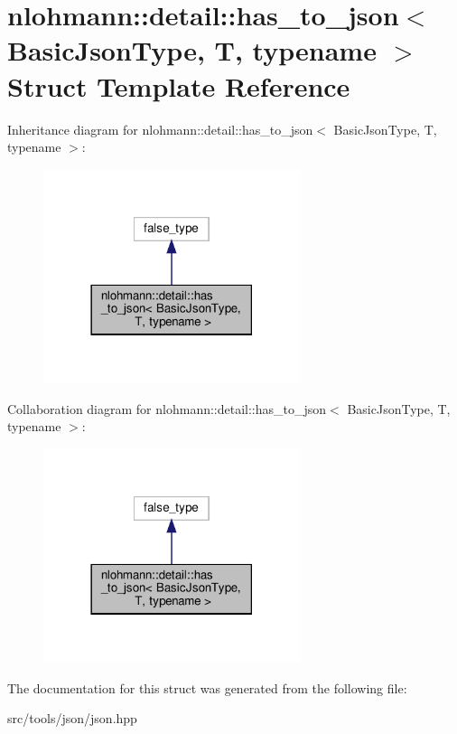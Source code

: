\hypertarget{structnlohmann_1_1detail_1_1has__to__json}{}\section{nlohmann\+:\+:detail\+:\+:has\+\_\+to\+\_\+json$<$ Basic\+Json\+Type, T, typename $>$ Struct Template Reference}
\label{structnlohmann_1_1detail_1_1has__to__json}


Inheritance diagram for nlohmann\+:\+:detail\+:\+:has\+\_\+to\+\_\+json$<$ Basic\+Json\+Type, T, typename $>$\+:
\nopagebreak
\begin{figure}[H]
\begin{center}
\leavevmode
\includegraphics[width=213pt]{structnlohmann_1_1detail_1_1has__to__json__inherit__graph}
\end{center}
\end{figure}


Collaboration diagram for nlohmann\+:\+:detail\+:\+:has\+\_\+to\+\_\+json$<$ Basic\+Json\+Type, T, typename $>$\+:
\nopagebreak
\begin{figure}[H]
\begin{center}
\leavevmode
\includegraphics[width=213pt]{structnlohmann_1_1detail_1_1has__to__json__coll__graph}
\end{center}
\end{figure}


The documentation for this struct was generated from the following file\+:\begin{DoxyCompactItemize}
\item 
src/tools/json/json.\+hpp\end{DoxyCompactItemize}
